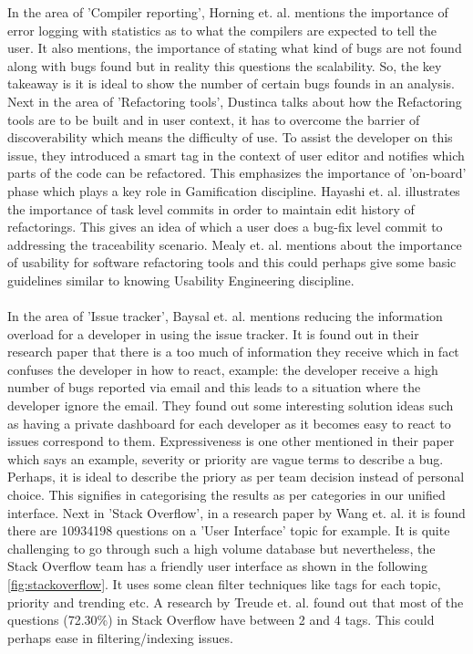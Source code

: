In the area of 'Compiler reporting', Horning et. al. \cite{horning} mentions the importance of error logging with statistics as to what the compilers are expected to tell the user. It also mentions, the importance of stating what kind of bugs are not found along with bugs found but in reality this questions the scalability. So, the key takeaway is it is ideal to show the number of certain bugs founds in an analysis. Next in the area of 'Refactoring tools', Dustinca \cite{dustinca} talks about how the Refactoring tools are to be built and in user context, it has to overcome the barrier of discoverability which means the difficulty of use. To assist the developer on this issue, they introduced a smart tag in the context of user editor and notifies which parts of the code can be refactored. This emphasizes the importance of 'on-board' phase which plays a key role in Gamification \cite{gamify} discipline. Hayashi et. al. \cite{Hayashi} illustrates the importance of task level commits in order to maintain edit history of refactorings. This gives an idea of which a user does a bug-fix level commit to addressing the traceability scenario. Mealy et. al. \cite{Mealy} mentions about the importance of usability for software refactoring tools and this could perhaps give some basic guidelines similar to knowing Usability Engineering \cite{usability} discipline. \\ \\

In the area of 'Issue tracker', Baysal et. al. \cite{Baysal} mentions reducing the information overload for a developer in using the issue tracker. It is found out in their research paper that there is a too much of information they receive which in fact confuses the developer in how to react, example: the developer receive a high number of bugs reported via email and this leads to a situation where the developer ignore the email. They found out some interesting solution ideas such as having a private dashboard for each developer as it becomes easy to react to issues correspond to them. Expressiveness is one other mentioned in their paper which says an example, severity or priority are vague terms to describe a bug. Perhaps, it is ideal to describe the priory as per team decision instead of personal choice.  This signifies in categorising the results as per categories in our unified interface. Next in 'Stack Overflow', in a research paper by Wang et. al. \cite{stack} it is found there are 10934198 questions on a 'User Interface' topic for example. It is quite challenging to go through such a high volume database but nevertheless, the Stack Overflow team has a friendly user interface as shown in the following  \autoref{fig:stackoverflow}. It uses some clean filter techniques like tags for each topic, priority and trending etc. A research by Treude et. al. \cite{Treude.2011} found out that most of the questions (72.30\%) in Stack Overflow have between 2 and 4 tags. This could perhaps ease in filtering/indexing issues. \\ \\


